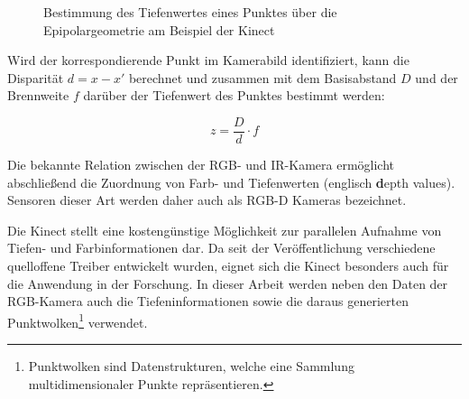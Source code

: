 
\begin{figure}[ht]
	\begin{center}
		\caption{Bestimmung des Tiefenwertes eines Punktes über die Epipolargeometrie am Beispiel der Kinect}
		\label{fig.kinect_depth}
	\end{center}
\end{figure}

\prever{
}

Wird der korrespondierende Punkt im Kamerabild identifiziert, kann die Disparität $d = x - x'$ berechnet und zusammen mit dem Basisabstand $D$ und der Brennweite $f$ darüber der Tiefenwert des Punktes bestimmt werden:


\prever{
}

\begin{equation}
z = \frac{D}{d}\cdot f
\end{equation}

Die bekannte Relation zwischen der RGB- und IR-Kamera ermöglicht abschließend die Zuordnung von Farb- und Tiefenwerten (englisch \textbf{d}epth values). Sensoren dieser Art werden daher auch als RGB-D Kameras bezeichnet.\\


Die Kinect stellt eine kostengünstige Möglichkeit zur parallelen Aufnahme von Tiefen- und Farbinformationen dar. Da seit der Veröffentlichung verschiedene quelloffene Treiber entwickelt wurden, eignet sich die Kinect besonders auch für die Anwendung in der Forschung. In dieser Arbeit werden neben den Daten der RGB-Kamera auch die Tiefeninformationen sowie die daraus generierten Punktwolken\footnote{Punktwolken sind Datenstrukturen, welche eine Sammlung multidimensionaler Punkte repräsentieren.
} verwendet.

